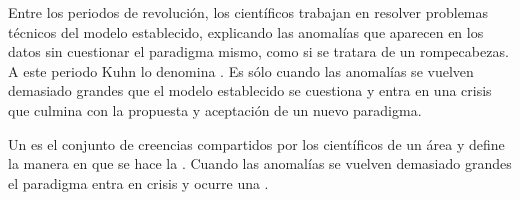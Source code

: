 Entre los periodos de revolución, los científicos trabajan en resolver problemas
técnicos del modelo establecido, explicando las anomalías que aparecen en los
datos sin cuestionar el paradigma mismo, como si se tratara de un rompecabezas.
A este periodo Kuhn lo denomina .
Es sólo cuando las anomalías se vuelven demasiado grandes que el modelo
establecido se cuestiona y entra en una crisis que culmina con la propuesta y
aceptación de un nuevo paradigma.






\begin{remember}
    \label{rem:paradigma}
    Un  es el conjunto de creencias compartidos por los
    científicos de un área y define la manera en que se hace la
    .
    Cuando las anomalías se vuelven demasiado grandes el paradigma entra
    en crisis y ocurre una .
\end{remember}

